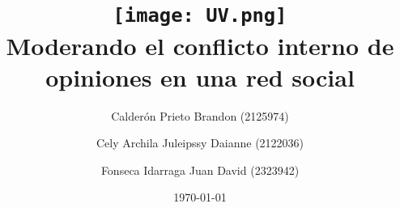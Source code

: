 \title{
	\texttt{[image: UV.png]} \\[1cm]
	Moderando el conflicto interno de opiniones en una red social
}
\author{
	Calderón Prieto Brandon (2125974) \and
	Cely Archila Juleipssy Daianne (2122036) \and
	Fonseca Idarraga Juan David (2323942)
}
\date{\today}
